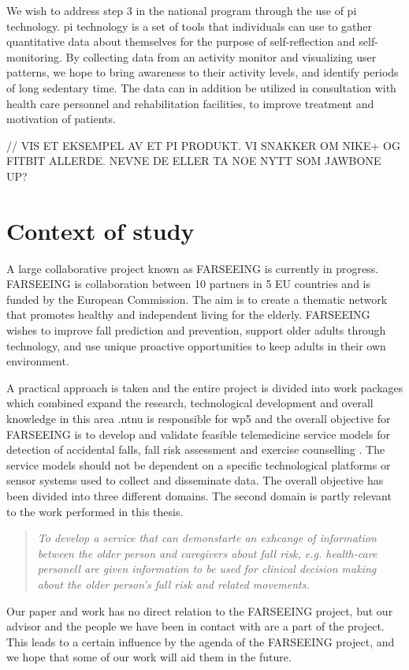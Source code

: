 We wish to address step 3 in the national program through the use of \gls{pi} technology. \gls{pi} technology is a set of tools that individuals can use to gather quantitative data about themselves for the purpose of self-reflection and self-monitoring. By collecting data from an activity monitor and visualizing user patterns,  we hope to bring awareness to their activity levels, and identify periods of long sedentary time. The data can in addition be utilized in consultation with health care personnel and rehabilitation facilities, to improve treatment and motivation of patients.

// VIS ET EKSEMPEL AV ET PI PRODUKT. VI SNAKKER OM NIKE+ OG FITBIT ALLERDE. NEVNE DE ELLER TA NOE NYTT SOM JAWBONE UP?



\section{Context of study}
A large collaborative project known as FARSEEING is currently in progress. FARSEEING is collaboration between 10 partners in 5 EU countries and is funded by the European Commission. The aim is to create a thematic network that promotes healthy and independent living for the elderly. FARSEEING wishes to improve fall prediction and prevention, support older adults through technology, and use unique proactive opportunities to keep adults in their own environment.

A practical approach is taken and the entire project is divided into work packages which combined expand the research, technological development and overall knowledge in this area \cite{farseeing}.\gls{ntnu} is responsible for \gls{wp5} and the overall objective for FARSEEING is to develop and validate feasible telemedicine service models for detection of accidental falls, fall risk assessment and exercise counselling \cite{wp5}. The service models should not be dependent on a specific technological platforms or sensor systems used to collect and disseminate data. The overall objective has been divided into three different domains. The second domain is partly relevant to the work performed in this thesis.
\begin{quote}
\textit{To develop a service that can demonstarte an exhcange of information between the older person and caregivers about fall risk, e.g. health-care personell are given information to be used for clinical decision making about the older person's fall risk and related movements.}
\end{quote}
Our paper and work has no direct relation to the FARSEEING project, but our advisor and the people we have been in contact with are a part of the project. This leads to a certain influence by the agenda of the FARSEEING project, and we hope that some of our work will aid them in the future.

